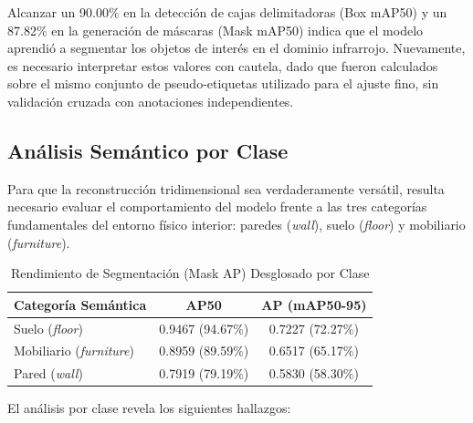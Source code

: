 \documentclass[12pt, a4, twoside, openany]{report}
\begin{document}
Alcanzar un 90.00\% en la detección de cajas delimitadoras (Box mAP50) y un 87.82\% en la generación de máscaras (Mask mAP50) indica que el modelo aprendió a segmentar los objetos de interés en el dominio infrarrojo. Nuevamente, es necesario interpretar estos valores con cautela, dado que fueron calculados sobre el mismo conjunto de pseudo-etiquetas utilizado para el ajuste fino, sin validación cruzada con anotaciones independientes.

\subsection{Análisis Semántico por Clase}

Para que la reconstrucción tridimensional sea verdaderamente versátil, resulta necesario evaluar el comportamiento del modelo frente a las tres categorías fundamentales del entorno físico interior: paredes (\textit{wall}), suelo (\textit{floor}) y mobiliario (\textit{furniture}).

\begin{table}[H]
\centering
\caption{Rendimiento de Segmentación (Mask AP) Desglosado por Clase}
\label{tab:yolo_classes}
\begin{tabular}{lcc}
\toprule
\textbf{Categoría Semántica} & \textbf{AP50} & \textbf{AP (mAP50-95)} \\
\midrule
Suelo (\textit{floor}) & 0.9467 (94.67\%) & 0.7227 (72.27\%) \\
Mobiliario (\textit{furniture}) & 0.8959 (89.59\%) & 0.6517 (65.17\%) \\
Pared (\textit{wall}) & 0.7919 (79.19\%) & 0.5830 (58.30\%) \\
\bottomrule
\end{tabular}
\end{table}

El análisis por clase revela los siguientes hallazgos:
\end{document}

